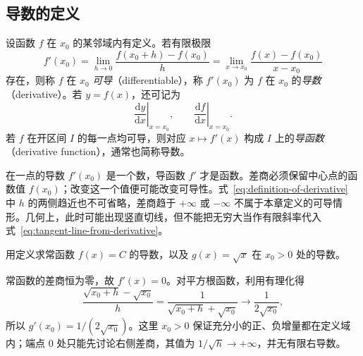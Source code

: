 \subsection{导数的定义}
\label{subsec:definition-of-derivatives}

\begin{definition}
\label{def:derivative-at-a-point}
设函数 $f$ 在 $x_0$ 的某邻域内有定义。若有限极限
\begin{equation}
\label{eq:definition-of-derivative}
    f'(x_0)=\lim_{h\to0}\frac{f(x_0+h)-f(x_0)}h
    =\lim_{x\to x_0}\frac{f(x)-f(x_0)}{x-x_0}
\end{equation}
存在，则称 $f$ 在 $x_0$ \emph{可导}（differentiable），称 $f'(x_0)$ 为 $f$ 在 $x_0$ 的\emph{导数}（derivative）。若 $y=f(x)$，还可记为
\[
    \left.\frac{\mathrm dy}{\mathrm dx}\right|_{x=x_0},\qquad
    \left.\frac{\mathrm df}{\mathrm dx}\right|_{x=x_0}.
\]
若 $f$ 在开区间 $I$ 的每一点均可导，则对应 $x\mapsto f'(x)$ 构成 $I$ 上的\emph{导函数}（derivative function），通常也简称导数。
\end{definition}

在一点的导数 $f'(x_0)$ 是一个数，导函数 $f'$ 才是函数。差商必须保留中心点的函数值 $f(x_0)$；改变这一个值便可能改变可导性。式~\eqref{eq:definition-of-derivative} 中 $h$ 的两侧趋近也不可省略，差商趋于 $+\infty$ 或 $-\infty$ 不属于本章定义的可导情形。几何上，此时可能出现竖直切线，但不能把无穷大当作有限斜率代入式~\eqref{eq:tangent-line-from-derivative}。

\begin{example}
\label{ex:derivatives-of-constant-and-square-root}
用定义求常函数 $f(x)=C$ 的导数，以及 $g(x)=\sqrt{x}$ 在 $x_0>0$ 处的导数。
\end{example}
\begin{solve}
常函数的差商恒为零，故 $f'(x)=0$。对平方根函数，利用有理化得
\[
    \frac{\sqrt{x_0+h}-\sqrt{x_0}}h
    =\frac1{\sqrt{x_0+h}+\sqrt{x_0}}
    \longrightarrow\frac1{2\sqrt{x_0}},
\]
所以 $g'(x_0)=1/(2\sqrt{x_0})$。这里 $x_0>0$ 保证充分小的正、负增量都在定义域内；端点 $0$ 处只能先讨论右侧差商，其值为 $1/\sqrt{h}\to+\infty$，并无有限右导数。
\end{solve}

